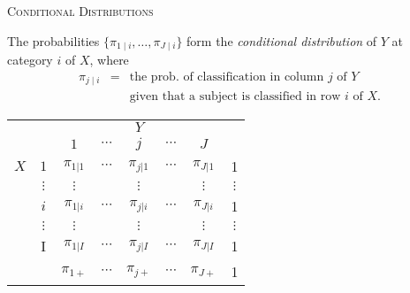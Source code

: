 \documentclass[dvipdfmx, serif,handout]{beamer}
\begin{document}
\begin{frame}{\textsc{Conditional Distributions}}

	\bi
	\item The probabilities $\{\pi_{1 \mid i}, \ldots, \pi_{J \mid i}\}$ form the {\it conditional distribution} of $Y$ at category $i$ of $X$, where
	\begin{eqnarray*}
		\pi_{j \mid i} &=& \mbox{the prob. of classification in column $j$ of $Y$} \\
		&& \mbox{given that a subject is classified in row $i$ of $X$.}
	\end{eqnarray*}
	\centering
	\begin{tabular}{cc|ccccc|c}
		\hline
		    &          & \multicolumn{5}{c|}{$Y$} &                                                                    \\
		    &          & {$1$}                    & {$\cdots$} & {$j$}         & {$\cdots$} & {$J$}         &          \\\hline
		$X$ & $1$      & $\pi_{1|1}$              & $\cdots$   & $\pi_{j|1}$   & $\cdots$   & $\pi_{J|1}$   & 1        \\
		    & $\vdots$ & $\vdots$                 &            & $\vdots$      &            & $\vdots$      & $\vdots$ \\
		    & {$i$}    & {$\pi_{1|i}$}            & {$\cdots$} & {$\pi_{j|i}$} & {$\cdots$} & {$\pi_{J|i}$} & 1        \\
		    & $\vdots$ & $\vdots$                 &            & $\vdots$      &            & $\vdots$      & $\vdots$ \\
		    & I        & $\pi_{1|I}$              & $\cdots$   & $\pi_{j|I}$   & $\cdots$   & $\pi_{J|I}$   & 1        \\\hline
		    &          & $\pi_{1+}$               & $\cdots$   & $\pi_{j+}$    & $\cdots$   & $\pi_{J+}$    & 1        \\
	\end{tabular}

	\ei

\end{frame}
\end{document}
